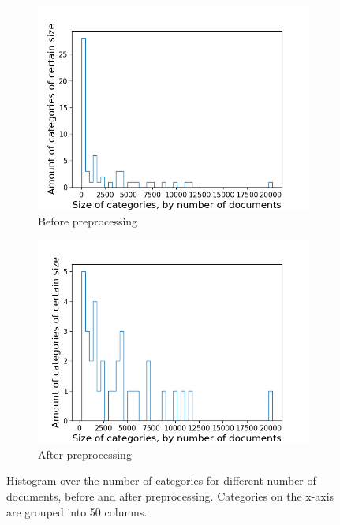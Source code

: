 \begin{figure}[ht]
	\centering
	\begin{subfigure}{0.45\textwidth}
		\centering
		\includegraphics[width=\linewidth]{figures/category_hist2_before.png}
		\caption{Before preprocessing}
		\label{fig:category_hist_before}
	\end{subfigure}
	\begin{subfigure}{0.45\textwidth}
		\centering
		\includegraphics[width=\linewidth]{figures/category_hist2_140.png}
		\caption{After preprocessing}
		\label{fig:category_hist_after}
	\end{subfigure}
	\caption{Histogram over the number of categories for different number of documents, before and after preprocessing.
	Categories on the x-axis are grouped into 50 columns.}
	\label{fig:category_hist}
\end{figure}

